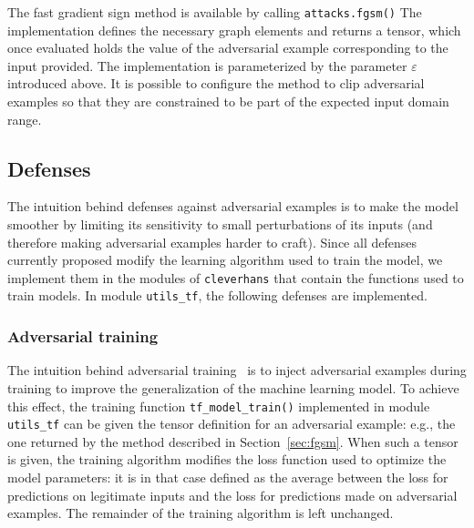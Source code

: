 The fast gradient sign method is available by calling \texttt{attacks.fgsm()}
The implementation defines the necessary graph elements and returns a tensor,
which once evaluated holds the value of the adversarial example corresponding to
the input provided. The implementation is parameterized by the parameter
$\varepsilon$ introduced above. It is possible to configure the method to clip
adversarial examples so that they are constrained to be part of the expected
input domain range.

\subsection{Defenses}

The intuition behind defenses against adversarial examples is to make the model
smoother by limiting its sensitivity to small perturbations of its inputs (and
therefore making adversarial examples harder to craft). Since all defenses
currently proposed modify the learning algorithm used to train the model, we
implement them in the modules of \texttt{cleverhans} that contain the functions
used to train models. In module \texttt{utils\_tf}, the following defenses are
implemented.

\subsubsection{Adversarial training}

The intuition behind adversarial
training~\cite{szegedy2013intriguing,goodfellow2014explaining} is to inject
adversarial examples during training to improve the generalization of the
machine learning model. To achieve this effect, the training function
\texttt{tf\_model\_train()} implemented in module \texttt{utils\_tf} can be
given the tensor definition for an adversarial example: e.g., the one returned
by the method described in Section~\ref{sec:fgsm}. When such a tensor is given,
the training algorithm modifies the loss function used to optimize the model
parameters: it is in that case defined as the average between the loss for
predictions on legitimate inputs and the loss for predictions made on
adversarial examples. The remainder of the training algorithm is left unchanged.


